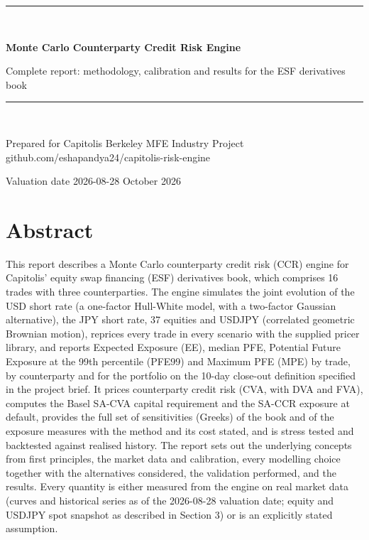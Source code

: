 \documentclass[11pt,letterpaper]{article}
\begin{document}
\begin{titlepage}
\vspace*{1.6in}
{\color{navy}\rule{\linewidth}{1.2pt}}\\[1.2em]
{\Huge\bfseries\color{navy} Monte Carlo Counterparty Credit Risk Engine\par}
\vspace{0.6em}
{\Large Complete report: methodology, calibration and results for the ESF derivatives book\par}
\vspace{0.6em}
{\color{navy}\rule{\linewidth}{1.2pt}}\\[2em]
{\large Prepared for Capitolis \textbar{} Berkeley MFE Industry Project \textbar{} github.com/eshapandya24/capitolis-risk-engine\par}
\vspace{0.4em}
{\normalsize Valuation date 2026-08-28 \textbar{} October 2026\par}
\end{titlepage}
\section*{Abstract}
This report describes a Monte Carlo counterparty credit risk (CCR) engine for Capitolis' equity swap financing (ESF) derivatives book, which comprises 16 trades with three counterparties. The engine simulates the joint evolution of the USD short rate (a one-factor Hull-White model, with a two-factor Gaussian alternative), the JPY short rate, 37 equities and USDJPY (correlated geometric Brownian motion), reprices every trade in every scenario with the supplied pricer library, and reports Expected Exposure (EE), median PFE, Potential Future Exposure at the 99th percentile (PFE99) and Maximum PFE (MPE) by trade, by counterparty and for the portfolio on the 10-day close-out definition specified in the project brief. It prices counterparty credit risk (CVA, with DVA and FVA), computes the Basel SA-CVA capital requirement and the SA-CCR exposure at default, provides the full set of sensitivities (Greeks) of the book and of the exposure measures with the method and its cost stated, and is stress tested and backtested against realised history. The report sets out the underlying concepts from first principles, the market data and calibration, every modelling choice together with the alternatives considered, the validation performed, and the results. Every quantity is either measured from the engine on real market data (curves and historical series as of the 2026-08-28 valuation date; equity and USDJPY spot snapshot as described in Section 3) or is an explicitly stated assumption.
\end{document}
